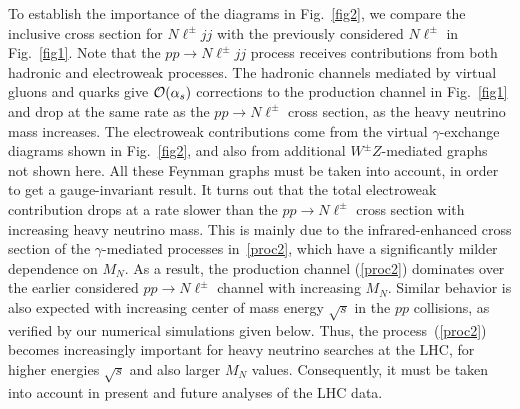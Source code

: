 \documentclass[reprint,prl,twocolumn,superscriptaddress,showpacs,nofootinbib,floatfix,preprintnumbers]{revtex4-1}
\begin{document}
To  establish the importance  of the  diagrams in  Fig.~\ref{fig2}, we
compare the inclusive  cross section for $N\ell^\pm jj$ 
with  the  previously  considered $N\ell^\pm$  in Fig.~\ref{fig1}.   
Note  that   the $pp\to N\ell^\pm jj$  process  receives
contributions  from  both  hadronic  and electroweak  processes.   The
hadronic channels  mediated by virtual  gluons and quarks  give ${\cal
  O}(\alpha_s)$  corrections  to   the  production  channel  in
Fig.~\ref{fig1} and  drop at  the same rate  as the  $pp\to N\ell^\pm$
cross  section,  as the  heavy  neutrino  mass  increases.   The
electroweak contributions come from the
virtual $\gamma$-exchange diagrams  shown in Fig.~\ref{fig2}, and also
from additional  $W^\pm Z$-mediated graphs not shown  here.  All these
Feynman  graphs  must  be  taken  into  account, in  order  to  get  a
gauge-invariant  result.   It turns  out  that  the total  electroweak
contribution drops at  a rate slower than the  $pp\to N\ell^\pm$ cross
section with increasing heavy neutrino mass.  This is mainly due
to  the  infrared-enhanced  cross  section  of  the  $\gamma$-mediated
processes in~\ref{proc2},  which have a significantly milder
dependence   on  $M_N$.    As   a  result,   the  production   channel
(\ref{proc2}) dominates over  the earlier considered $pp\to N\ell^\pm$
channel  with increasing  $M_N$.  Similar  behavior is  also expected
with  increasing  center  of   mass  energy  $\sqrt{s}$  in  the  $pp$
collisions,  as verified  by  our numerical  simulations given  below.
Thus,  the process~(\ref{proc2})  becomes  increasingly important  for
heavy neutrino searches at the LHC, for higher energies $\sqrt{s}$ and
also larger $M_N$ values.  Consequently, it must be taken into account
in present and future analyses of the LHC data.
\end{document}

